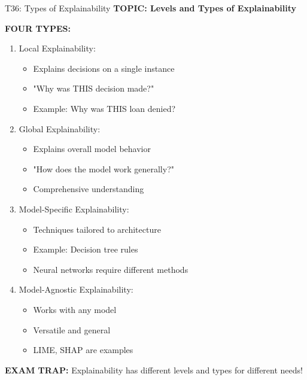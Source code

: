 \documentclass[8pt]{beamer}
\begin{document}
	\begin{frame}{T36: Types of Explainability}
		\fontsize{6.5}{7.5}\selectfont
		\textbf{TOPIC: Levels and Types of Explainability}
		
		\vspace{0.1cm}
		\textbf{FOUR TYPES:}
		\begin{enumerate}
			\item \textcolor{myblue}{Local Explainability:}
			\begin{itemize}
				\item Explains decisions on a single instance
				\item "Why was THIS decision made?"
				\item Example: Why was THIS loan denied?
			\end{itemize}
			\item \textcolor{myblue}{Global Explainability:}
			\begin{itemize}
				\item Explains overall model behavior
				\item "How does the model work generally?"
				\item Comprehensive understanding
			\end{itemize}
			\item \textcolor{myblue}{Model-Specific Explainability:}
			\begin{itemize}
				\item Techniques tailored to architecture
				\item Example: Decision tree rules
				\item Neural networks require different methods
			\end{itemize}
			\item \textcolor{myblue}{Model-Agnostic Explainability:}
			\begin{itemize}
				\item Works with any model
				\item Versatile and general
				\item LIME, SHAP are examples
			\end{itemize}
		\end{enumerate}
		
		\textcolor{myred}{\textbf{EXAM TRAP:}} Explainability has \textcolor{myblue}{different levels and types} for different needs!
	\end{frame}
	
\end{document}
